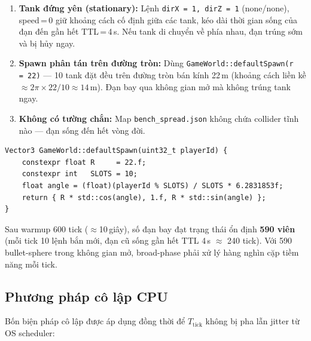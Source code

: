 \documentclass[12pt,a4paper]{report}
\begin{document}
\begin{enumerate}
  \item \textbf{Tank đứng yên (stationary):} Lệnh \texttt{dirX\,=\,1,\,dirZ\,=\,1}
        (none/none), speed\,=\,0 giữ khoảng cách cố định giữa các tank, kéo dài
        thời gian sống của đạn đến gần hết TTL\,=\,4\,s. Nếu tank di chuyển về
        phía nhau, đạn trúng sớm và bị hủy ngay.
  \item \textbf{Spawn phân tán trên đường tròn:} Dùng \texttt{GameWorld::defaultSpawn(r\,=\,22)}
        --- 10 tank đặt đều trên đường tròn bán kính 22\,m (khoảng cách liền kề
        $\approx 2\pi\!\times\!22/10 \approx 14$\,m). Đạn bay qua không gian mở
        mà không trúng tank ngay.
  \item \textbf{Không có tường chắn:} Map \texttt{bench\_spread.json} không chứa
        collider tĩnh nào --- đạn sống đến hết vòng đời.
\end{enumerate}

\begin{lstlisting}[style=cppStyle,
  caption={\texttt{defaultSpawn}: đặt 10 tank đều trên đường tròn bán kính 22\,m},
  label={lst:defaultspawn}]
Vector3 GameWorld::defaultSpawn(uint32_t playerId) {
    constexpr float R     = 22.f;
    constexpr int   SLOTS = 10;
    float angle = (float)(playerId % SLOTS) / SLOTS * 6.2831853f;
    return { R * std::cos(angle), 1.f, R * std::sin(angle) };
}
\end{lstlisting}

\noindent Sau warmup 600 tick ($\approx$10\,giây), số đạn bay đạt trạng thái ổn định
\textbf{590 viên} (mỗi tick 10 lệnh bắn mới, đạn cũ sống gần hết TTL 4\,s $\approx$ 240 tick).
Với 590 bullet-sphere trong không gian mở, broad-phase phải xử lý hàng nghìn cặp tiềm năng mỗi tick.

\subsection{Phương pháp cô lập CPU}

Bốn biện pháp cô lập được áp dụng đồng thời để $T_{\text{tick}}$ không bị pha lẫn
jitter từ OS scheduler:
\end{document}
